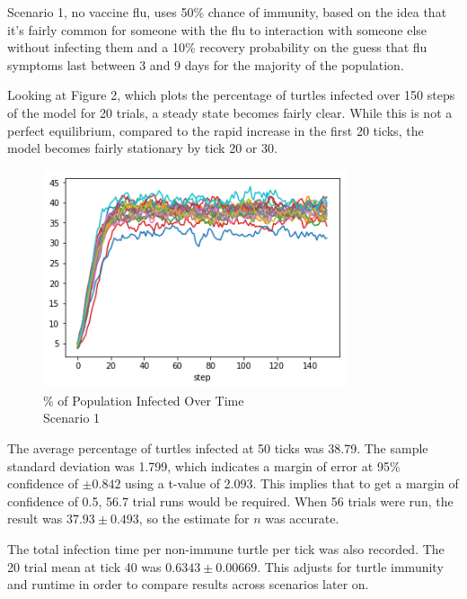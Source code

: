 \documentclass[11pt]{article} %
\begin{document}
Scenario 1, no vaccine flu, uses 50\% chance of immunity, based on the idea that it's fairly common for someone with the flu to interaction with someone else without infecting them and a 10\% recovery probability on the guess that flu symptoms last between 3 and 9 days for the majority of the population.


Looking at Figure 2, which plots the percentage of turtles infected over 150 steps of the model for 20 trials, a steady state becomes fairly clear. While this is not a perfect equilibrium, compared to the rapid increase in the first 20 ticks, the model becomes fairly stationary by tick 20 or 30.   

\begin{figure}
\centering
\includegraphics[width=0.8\textwidth]{scen_1_steady_state}
\caption{\% of Population Infected Over Time \\ Scenario 1}
\end{figure}



The average percentage of turtles infected at 50 ticks was 38.79. The sample standard deviation was 1.799, which indicates a margin of error at 95\% confidence of $\pm 0.842$ using a t-value of 2.093. This implies that to get a margin of confidence of 0.5, 56.7 trial runs would be required. When 56 trials were run, the result was $37.93 \pm 0.493$, so the estimate for $n$ was accurate. 

The total infection time per non-immune turtle per tick was also recorded. The 20 trial mean at tick 40 was $0.6343 \pm 0.00669$. This adjusts for turtle immunity and runtime in order to compare results across scenarios later on. 
\end{document}
